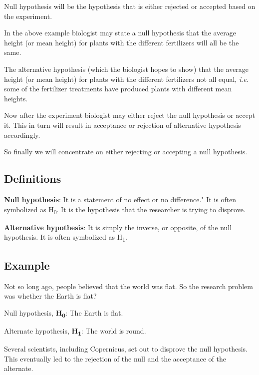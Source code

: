 \documentclass[
]{book}
\begin{document}
Null hypothesis will be the hypothesis that is either rejected or accepted based on the experiment.

In the above example biologist may state a null hypothesis that the average height (or mean height) for plants with the different fertilizers will all be the same.

The alternative hypothesis (which the biologist hopes to show) that the average height (or mean height) for plants with the different fertilizers not all equal, \emph{i}.\emph{e}. some of the fertilizer treatments have produced plants with different mean heights.~

Now after the experiment biologist may either reject the null hypothesis
or accept it. This in turn will result in acceptance or rejection of
alternative hypothesis accordingly.

So finally we will concentrate on either rejecting or accepting a null
hypothesis.

\hypertarget{definitions}{%
\subsection*{Definitions}\label{definitions}}

\textbf{Null hypothesis}: It is a statement of \textquotesingle no effect\textquotesingle{} or \textquotesingle no difference\textquotesingle." It is often symbolized as H\textsubscript{0}. It is the hypothesis that the researcher is trying to disprove.

\textbf{Alternative hypothesis}: It is simply the inverse, or opposite, of the null hypothesis. It is often symbolized as H\textsubscript{1}.

\hypertarget{example-9}{%
\subsection*{Example}\label{example-9}}

Not so long ago, people believed that the world was flat. So the research problem was whether the Earth is flat?

Null hypothesis, \textbf{H\textsubscript{0}}: The Earth is flat.

Alternate hypothesis, \textbf{H\textsubscript{1}}: The world is round.

Several scientists, including Copernicus, set out to disprove the null hypothesis. This eventually led to the rejection of the null and the acceptance of the alternate.
\end{document}
